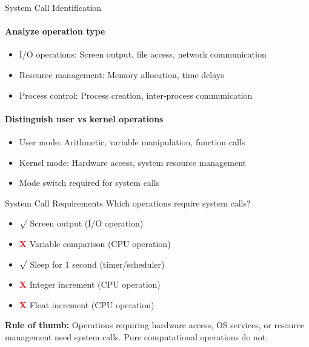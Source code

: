 \begin{KR}{System Call Identification}
    \paragraph{Analyze operation type}
    \begin{itemize}
        \item I/O operations: Screen output, file access, network communication
        \item Resource management: Memory allocation, time delays
        \item Process control: Process creation, inter-process communication
    \end{itemize}
    
    \paragraph{Distinguish user vs kernel operations}
    \begin{itemize}
        \item User mode: Arithmetic, variable manipulation, function calls
        \item Kernel mode: Hardware access, system resource management
        \item Mode switch required for system calls
    \end{itemize}
\end{KR}

\begin{example2}{System Call Requirements}
    Which operations require system calls?
    
    \begin{itemize}
        \item \textcolor{frog}{$\surd$} Screen output (I/O operation)
        \item \textcolor{red}{\textbf{X}} Variable comparison (CPU operation)
        \item \textcolor{frog}{$\surd$} Sleep for 1 second (timer/scheduler)
        \item \textcolor{red}{\textbf{X}} Integer increment (CPU operation)
        \item \textcolor{red}{\textbf{X}} Float increment (CPU operation)
    \end{itemize}
    
    \tcblower
    
    \textbf{Rule of thumb:}
    Operations requiring hardware access, OS services, or resource management need system calls. Pure computational operations do not.
\end{example2}